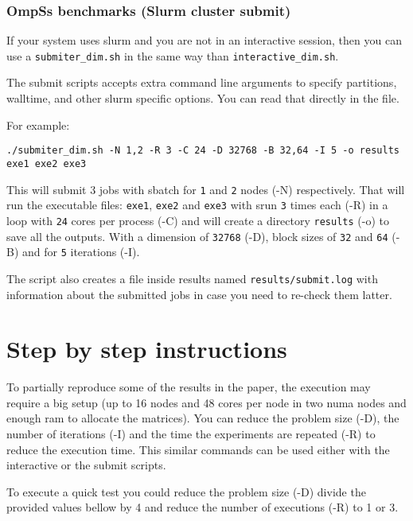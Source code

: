 \documentclass{article}
\newcommand{\code}[1]{\texttt{#1}}
\begin{document}
\subsubsection{OmpSs benchmarks (Slurm cluster submit)}

If your system uses slurm and you are not in an interactive session,
then you can use a \code{submiter\_dim.sh} in the same way than
\code{interactive\_dim.sh}. 

The submit scripts accepts extra command line arguments to specify
partitions, walltime, and other slurm specific options. You can read
that directly in the file.

For example:

\begin{lstlisting}
./submiter_dim.sh -N 1,2 -R 3 -C 24 -D 32768 -B 32,64 -I 5 -o results exe1 exe2 exe3
\end{lstlisting}

This will submit 3 jobs with sbatch for \code{1} and \code{2} nodes
(-N) respectively. That will run the executable files: \code{exe1},
\code{exe2} and \code{exe3} with srun \code{3} times each (-R) in a
loop with \code{24} cores per process (-C) and will create a directory
\code{results} (-o) to save all the outputs. With a dimension of
\code{32768} (-D), block sizes of \code{32} and \code{64} (-B) and for
\code{5} iterations (-I).

The script also creates a file inside results named
\code{results/submit.log} with information about the submitted jobs in
case you need to re-check them latter.

\section{Step by step instructions}

To partially reproduce some of the results in the paper, the execution
may require a big setup (up to 16 nodes and 48 cores per node in two
numa nodes and enough ram to allocate the matrices). You can reduce
the problem size (-D), the number of iterations (-I) and the time the
experiments are repeated (-R) to reduce the execution time. This
similar commands can be used either with the interactive or the submit
scripts.

To execute a quick test you could reduce the problem size (-D) divide
the provided values bellow by 4 and reduce the number of executions
(-R) to 1 or 3.
\end{document}
